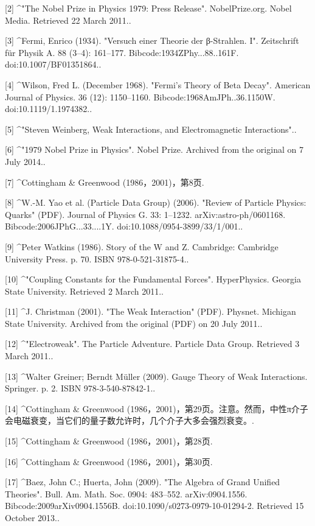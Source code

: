 [2]
^"The Nobel Prize in Physics 1979: Press Release". NobelPrize.org. Nobel Media. Retrieved 22 March 2011..

[3]
^Fermi, Enrico (1934). "Versuch einer Theorie der β-Strahlen. I". Zeitschrift für Physik A. 88 (3–4): 161–177. Bibcode:1934ZPhy...88..161F. doi:10.1007/BF01351864..

[4]
^Wilson, Fred L. (December 1968). "Fermi's Theory of Beta Decay". American Journal of Physics. 36 (12): 1150–1160. Bibcode:1968AmJPh..36.1150W. doi:10.1119/1.1974382..

[5]
^"Steven Weinberg, Weak Interactions, and Electromagnetic Interactions"..

[6]
^"1979 Nobel Prize in Physics". Nobel Prize. Archived from the original on 7 July 2014..

[7]
^Cottingham & Greenwood (1986，2001)，第8页.

[8]
^W.-M. Yao et al. (Particle Data Group) (2006). "Review of Particle Physics: Quarks" (PDF). Journal of Physics G. 33: 1–1232. arXiv:astro-ph/0601168. Bibcode:2006JPhG...33....1Y. doi:10.1088/0954-3899/33/1/001..

[9]
^Peter Watkins (1986). Story of the W and Z. Cambridge: Cambridge University Press. p. 70. ISBN 978-0-521-31875-4..

[10]
^"Coupling Constants for the Fundamental Forces". HyperPhysics. Georgia State University. Retrieved 2 March 2011..

[11]
^J. Christman (2001). "The Weak Interaction" (PDF). Physnet. Michigan State University. Archived from the original (PDF) on 20 July 2011..

[12]
^"Electroweak". The Particle Adventure. Particle Data Group. Retrieved 3 March 2011..

[13]
^Walter Greiner; Berndt Müller (2009). Gauge Theory of Weak Interactions. Springer. p. 2. ISBN 978-3-540-87842-1..

[14]
^Cottingham & Greenwood (1986，2001)，第29页。注意。然而，中性π介子会电磁衰变，当它们的量子数允许时，几个介子大多会强烈衰变。.

[15]
^Cottingham & Greenwood (1986，2001)，第28页.

[16]
^Cottingham & Greenwood (1986，2001)，第30页.

[17]
^Baez, John C.; Huerta, John (2009). "The Algebra of Grand Unified Theories". Bull. Am. Math. Soc. 0904: 483–552. arXiv:0904.1556. Bibcode:2009arXiv0904.1556B. doi:10.1090/s0273-0979-10-01294-2. Retrieved 15 October 2013..

